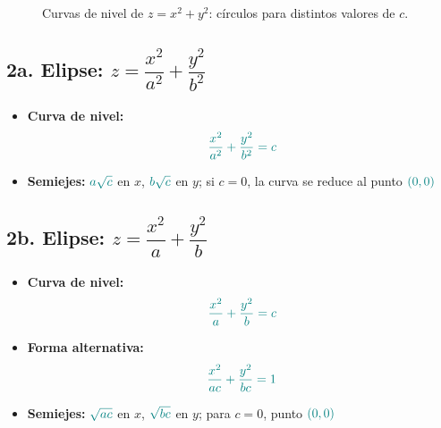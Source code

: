 \documentclass{article}
\begin{document}
\begin{figure}[H]
    \centering
    \caption{Curvas de nivel de \( z = x^2 + y^2 \): círculos para distintos valores de \( c \).}
\end{figure}


\subsection*{2a. Elipse: \(z=\dfrac{x^2}{a^2}+\dfrac{y^2}{b^2}\)}
\begin{itemize}
    \item \textbf{Curva de nivel:} \[
    \color{teal} \frac{x^2}{a^2}+\frac{y^2}{b^2}=c
    \]
    \item \textbf{Semiejes:} \(\color{teal} a\sqrt{c}\) en \(x\), \(\color{teal} b\sqrt{c}\) en \(y\); si \(c=0\), la curva se reduce al punto \(\color{teal} (0,0)\)
\end{itemize}



\subsection*{2b. Elipse: \(z=\dfrac{x^2}{a}+\dfrac{y^2}{b}\)}
\begin{itemize}
    \item \textbf{Curva de nivel:} \[
    \color{teal} \frac{x^2}{a}+\frac{y^2}{b}=c
    \]
    \item \textbf{Forma alternativa:} \[
    \color{teal} \frac{x^2}{ac} + \frac{y^2}{bc} = 1
    \]
    \item \textbf{Semiejes:} \(\color{teal} \sqrt{ac}\) en \(x\), \(\color{teal} \sqrt{bc}\) en \(y\); para \(c=0\), punto \(\color{teal} (0,0)\)
\end{itemize}
\end{document}
